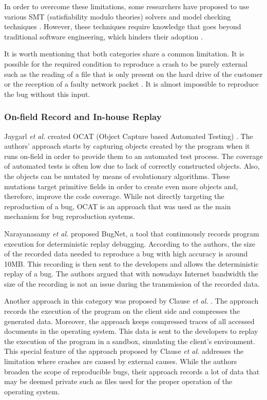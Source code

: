 In order to overcome these limitations, some researchers have proposed to use various SMT (satisfiability modulo theories) solvers \cite{Dutertre2006} and model checking techniques \cite{Visser2003}.
However, these techniques require knowledge that goes beyond traditional software engineering, which hinders their adoption  \cite{Visser2004}.

It is worth mentioning that both categories share a common limitation.
It is possible for the required condition to reproduce a crash to be purely external such as the reading of a file that is only present on the hard drive of the customer or the reception of a faulty network packet \cite{Chen2013a, Nayrolles2015}.
It is almost impossible to reproduce the bug without this input.

\subsubsection{On-field Record and In-house Replay}

Jaygarl {\it et al.} created OCAT (Object Capture based Automated Testing) \cite{Jaygarl}.
The authors' approach starts by capturing objects created by the program when it runs on-field in order to provide them to an automated test process.
The coverage of automated tests is often low due to lack of correctly constructed objects. Also, the objects can be mutated by means of evolutionary algorithms.
These mutations target primitive fields in order to create even more objects and, therefore, improve the code coverage.
While not directly targeting the reproduction of a bug, OCAT is an approach that was used as the main mechanism for bug reproduction systems.

Narayanasamy {\it et al.} \cite{Narayanasamy2005} proposed BugNet, a tool that continuously records program execution for deterministic replay debugging.
According to the authors, the size of the recorded data needed to reproduce a bug with high accuracy is around 10MB.
This recording is then sent to the developers and allows the deterministic replay of a bug.
The authors argued that with nowadays Internet bandwidth the size of the recording is not an issue during the transmission of the recorded data.

Another approach in this category was  proposed by Clause {\it et al.} \cite{Clause2007}.
The approach records the execution of the program on the client side and compresses the generated data.
Moreover, the approach keeps compressed traces of all accessed documents in the operating system.
This data is sent to the developers to replay the execution of the program in a sandbox, simulating the client's environment.
This special feature of the approach proposed by Clause {\it et al.} addresses the limitation where crashes are caused by external causes.
While the authors broaden the scope of reproducible bugs, their approach records a lot of data that may be deemed private such as files used for the proper operation of the operating system.

